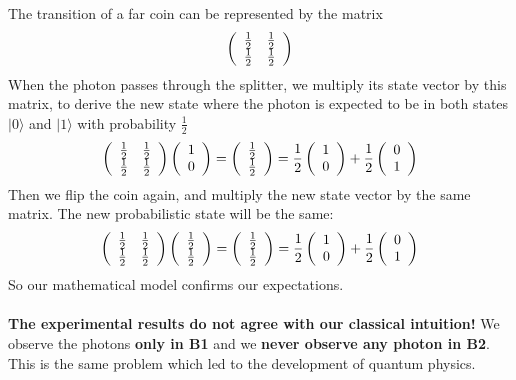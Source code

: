 \documentclass[10pt]{report}
\begin{document}
The transition of a far coin can be represented by the matrix $$\left(\begin{array}{c c}
\frac{1}{2}&\frac{1}{2}\\\frac{1}{2}&\frac{1}{2}
\end{array}\right)$$
When the photon passes through the splitter, we multiply its state vector by this matrix, to derive the new state where the photon is expected to be in both states $|0\rangle$ and $|1\rangle$ with probability $\frac{1}{2}$
$$\left(\begin{array}{c c}
\frac{1}{2}&\frac{1}{2}\\\frac{1}{2}&\frac{1}{2}
\end{array}\right)\left(\begin{array}{c}
1\\0
\end{array}\right) = \left(\begin{array}{c}
\frac{1}{2}\\\frac{1}{2}
\end{array}\right) = \frac{1}{2}\left(\begin{array}{c}
1\\0
\end{array}\right) + \frac{1}{2}\left(\begin{array}{c}
0\\1
\end{array}\right)$$
Then we flip the coin again, and multiply the new state vector by the same matrix. The new probabilistic state will be the same:
$$\left(\begin{array}{c c}
\frac{1}{2}&\frac{1}{2}\\\frac{1}{2}&\frac{1}{2}
\end{array}\right)\left(\begin{array}{c}
\frac{1}{2}\\\frac{1}{2}
\end{array}\right) = \left(\begin{array}{c}
\frac{1}{2}\\\frac{1}{2}
\end{array}\right) = \frac{1}{2}\left(\begin{array}{c}
1\\0
\end{array}\right) + \frac{1}{2}\left(\begin{array}{c}
0\\1
\end{array}\right)$$
So our mathematical model confirms our expectations.\\\\
\textbf{The experimental results do not agree with our classical intuition!} We observe the photons \textbf{only in B1} and we \textbf{never observe any photon in B2}. This is the same problem which led to the development of quantum physics.
\end{document}
